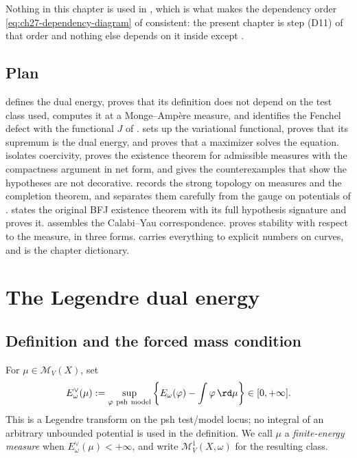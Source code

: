 Nothing in this chapter is used in
,
which is what makes the dependency order
\eqref{eq:ch27-dependency-diagram} of  consistent:
the present chapter is step \textup{(D11)} of that order and nothing else
depends on it inside  except
.

\subsection{Plan}
\label{sec:ch28-plan}

 defines the dual energy, proves that its
definition does not depend on the test class used, computes it at a
Monge--Amp\`ere measure, and identifies the Fenchel defect with the
functional $J$ of .
 sets up the variational functional, proves that
its supremum is the dual energy, and proves that a maximizer solves the
equation.   isolates coercivity, proves the
existence theorem for admissible measures with the compactness argument in
net form, and gives the counterexamples that show the hypotheses are not
decorative.   records the strong topology on
measures and the completion theorem, and separates them carefully from the
gauge on potentials of .
 states the original BFJ existence theorem with
its full hypothesis signature and proves it.  
assembles the Calabi--Yau correspondence.   proves
stability with respect to the measure, in three forms.
 carries everything to explicit numbers on curves, and
 is the chapter dictionary.

\section{The Legendre dual energy}
\label{sec:ch28-dual-energy}

\subsection{Definition and the forced mass condition}
\label{sec:ch28-dual-def}

\begin{definition}
\label{def:dual-energy-measure}
For $\mu\in\mathcal M_V(X)$, set
\begin{equation}
\label{eq:dual-energy-measure}
 E_\omega^\vee(\mu)
 :=\sup_{\varphi\ \mathrm{psh\ model}}
       \left\{E_\omega(\varphi)-\int\varphi\,\rd \mu\right\}
 \in[0,+\infty].
\end{equation}
This is a Legendre transform on the psh test/model locus; no integral of an
arbitrary unbounded potential is used in the definition.  We call $\mu$ a
\emph{finite-energy measure} when
$E_\omega^\vee(\mu)<+\infty$, and write
$\mathcal M^1_V(X,\omega)$ for the resulting class.
\end{definition}

